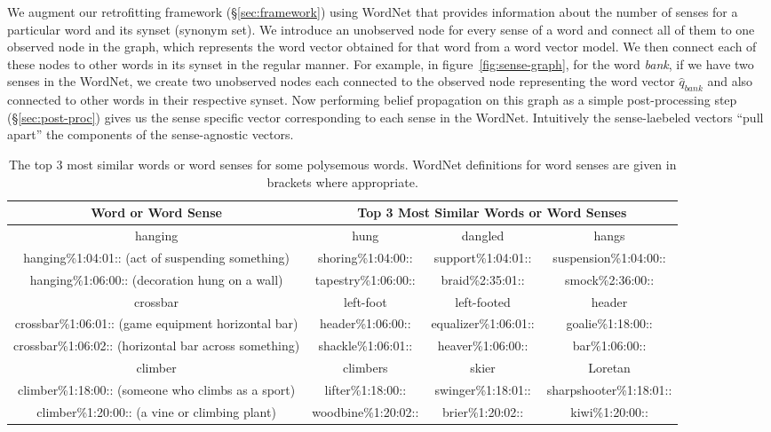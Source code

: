 \documentclass[11pt]{article}
\begin{document}
We augment our retrofitting framework (\S\ref{sec:framework}) using WordNet
that provides information about the number of senses for a particular word
and its synset (synonym set). We introduce an unobserved node for every sense of a 
word and connect all of them to one observed node in the graph, which represents the word
vector obtained for that word from a word vector model. We then connect
each of these nodes to other words in its synset in the regular manner. 
For example, in figure~\ref{fig:sense-graph}, for the word \textit{bank}, 
if we have two senses in the WordNet,
we create two unobserved nodes each connected to the observed node representing
the word vector $\hat{q}_{bank}$ and also connected to other words in their respective 
synset.
Now performing belief propagation on this graph as a simple post-processing step
(\S\ref{sec:post-proc}) gives us the sense specific vector corresponding to each
sense in the WordNet. 
Intuitively the sense-laebeled vectors ``pull apart'' the components of the 
sense-agnostic vectors.

\begin{table*}[ht]
\begin{center}
\begin{small}
\begin{tabular}{|c|ccc|}
\hline 
Word or Word Sense & \multicolumn{3}{c|}{Top 3 Most Similar Words or Word Senses}\tabularnewline
\hline 
hanging & hung & dangled & hangs\tabularnewline
hanging\%1:04:01:: (act of suspending something) & shoring\%1:04:00:: & support\%1:04:01:: & suspension\%1:04:00::\tabularnewline
hanging\%1:06:00:: (decoration hung on a wall) & tapestry\%1:06:00:: & braid\%2:35:01:: & smock\%2:36:00::\tabularnewline
\hline 
crossbar & left-foot & left-footed & header\tabularnewline
crossbar\%1:06:01:: (game equipment horizontal bar) & header\%1:06:00:: & equalizer\%1:06:01:: & goalie\%1:18:00::\tabularnewline
crossbar\%1:06:02:: (horizontal bar across something) & shackle\%1:06:01:: & heaver\%1:06:00:: & bar\%1:06:00::\tabularnewline
\hline 
climber & climbers & skier & Loretan\tabularnewline
climber\%1:18:00:: (someone who climbs as a sport) & lifter\%1:18:00:: & swinger\%1:18:01:: & sharpshooter\%1:18:01::\tabularnewline
climber\%1:20:00:: (a vine or climbing plant) & woodbine\%1:20:02:: & brier\%1:20:02:: & kiwi\%1:20:00::\tabularnewline
\hline 
\end{tabular}
\end{small}
\caption{The top 3 most similar words or word senses for some polysemous words. WordNet definitions for word senses are given in brackets where appropriate. 
}\label{tbl:mostsim}
\end{center}
\end{table*}
\end{document}
